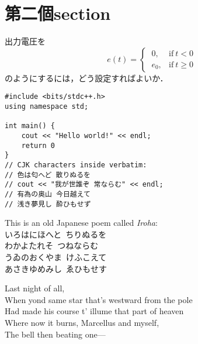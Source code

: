 \section{第二個section}

\begin{tcolorbox}[colback=myteal!5!white,colframe=myteal!75!black,title=\textsf{課題2}]
	出力電圧を
	\begin{equation*}
		e(t) =
		\begin{cases}
			\ 0,   & \text{if}\ t < 0   \\
			\ e_0, & \text{if}\ t \ge 0
		\end{cases}
	\end{equation*}
	のようにするには，どう設定すればよいか．
\end{tcolorbox}

\begin{verbatim}
#include <bits/stdc++.h>
using namespace std;

int main() {
	cout << "Hello world!" << endl;
	return 0
}
// CJK characters inside verbatim:
// 色は匂へど 散りぬるを
// cout << "我が世誰ぞ 常ならむ" << endl;
// 有為の奥山 今日越えて
// 浅き夢見し 酔ひもせず

\end{verbatim}

This is an old Japanese poem called \emph{Iroha}: \\
いろはにほへと\ ちりぬるを \\
わかよたれそ\ つねならむ \\
うゐのおくやま\ けふこえて \\
あさきゆめみし\ ゑひもせす

Last night of all, \\
When yond same star that's westward from the pole \\
Had made his course t' illume that part of heaven \\
Where now it burns, Marcellus and myself, \\
The bell then beating one—

